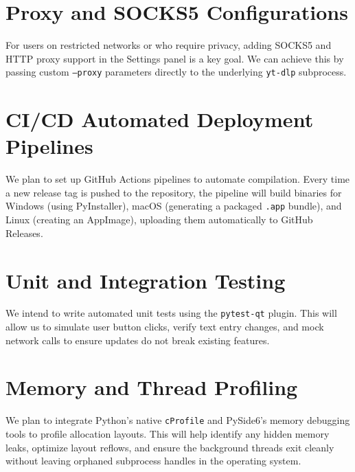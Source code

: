 \documentclass[12pt]{report}
\begin{document}
\section{Proxy and SOCKS5 Configurations}
For users on restricted networks or who require privacy, adding SOCKS5 and HTTP proxy support in the Settings panel is a key goal. We can achieve this by passing custom \texttt{--proxy} parameters directly to the underlying \texttt{yt-dlp} subprocess.

\section{CI/CD Automated Deployment Pipelines}
We plan to set up GitHub Actions pipelines to automate compilation. Every time a new release tag is pushed to the repository, the pipeline will build binaries for Windows (using PyInstaller), macOS (generating a packaged \texttt{.app} bundle), and Linux (creating an AppImage), uploading them automatically to GitHub Releases.

\section{Unit and Integration Testing}
We intend to write automated unit tests using the \texttt{pytest-qt} plugin. This will allow us to simulate user button clicks, verify text entry changes, and mock network calls to ensure updates do not break existing features.

\section{Memory and Thread Profiling}
We plan to integrate Python's native \texttt{cProfile} and PySide6's memory debugging tools to profile allocation layouts. This will help identify any hidden memory leaks, optimize layout reflows, and ensure the background threads exit cleanly without leaving orphaned subprocess handles in the operating system.
\end{document}
